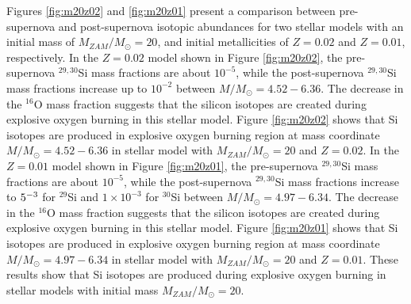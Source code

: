 \documentclass{brandeis-thesis3.2}
\def \msun {M_{\odot}}
\newcommand{\iso}[2]{$^{#1}${#2}}
\begin{document}
Figures \ref{fig:m20z02} and \ref{fig:m20z01} present a comparison between pre-supernova and post-supernova isotopic abundances for two stellar models with an initial mass of $M_{ZAM}/\msun =20$, and initial metallicities of $Z=0.02$ and $Z=0.01$, respectively. In the $Z=0.02$ model shown in Figure \ref{fig:m20z02}, the pre-supernova \iso{29, 30}{Si} mass fractions are about $10^{-5}$, while the post-supernova \iso{29, 30}{Si} mass fractions increase up to $10^{-2}$ between $M/\msun = 4.52 - 6.36$. The decrease in the \iso{16}{O} mass fraction suggests that the silicon isotopes are created during explosive oxygen burning in this stellar model. Figure \ref{fig:m20z02} shows that Si isotopes are produced in explosive oxygen burning region at mass coordinate $M/\msun = 4.52-6.36$ in stellar model with $M_{ZAM}/\msun =20$ and $Z=0.02$. In the $Z=0.01$ model shown in Figure \ref{fig:m20z01}, the pre-supernova \iso{29, 30}{Si} mass fractions are about $10^{-5}$, while the post-supernova \iso{29, 30}{Si} mass fractions increase to $5\time 10^{-3}$ for \iso{29}{Si} and $1\times 10^{-3}$ for \iso{30}{Si} between $M/\msun = 4.97 - 6.34$. The decrease in the \iso{16}{O} mass fraction suggests that the silicon isotopes are created during explosive oxygen burning in this stellar model. Figure \ref{fig:m20z01} shows that Si isotopes are produced in explosive oxygen burning region at mass coordinate $M/\msun = 4.97-6.34$ in stellar model with $M_{ZAM}/\msun =20$ and $Z=0.01$. These results show that Si isotopes are produced during explosive oxygen burning in stellar models with initial mass $M_{ZAM}/\msun =20$. 
\end{document}
